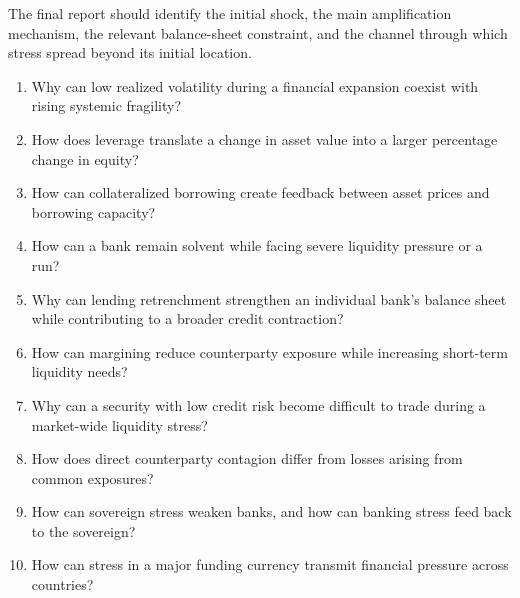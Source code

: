 The final report should identify the initial shock, the main amplification mechanism, the relevant balance-sheet constraint, and the channel through which stress spread beyond its initial location.




\begin{enumerate}

\item Why can low realized volatility during a financial expansion coexist with rising systemic fragility?

\item How does leverage translate a change in asset value into a larger percentage change in equity?

\item How can collateralized borrowing create feedback between asset prices and borrowing capacity?

\item How can a bank remain solvent while facing severe liquidity pressure or a run?

\item Why can lending retrenchment strengthen an individual bank's balance sheet while contributing to a broader credit contraction?

\item How can margining reduce counterparty exposure while increasing short-term liquidity needs?

\item Why can a security with low credit risk become difficult to trade during a market-wide liquidity stress?

\item How does direct counterparty contagion differ from losses arising from common exposures?

\item How can sovereign stress weaken banks, and how can banking stress feed back to the sovereign?

\item How can stress in a major funding currency transmit financial pressure across countries?

\end{enumerate}




